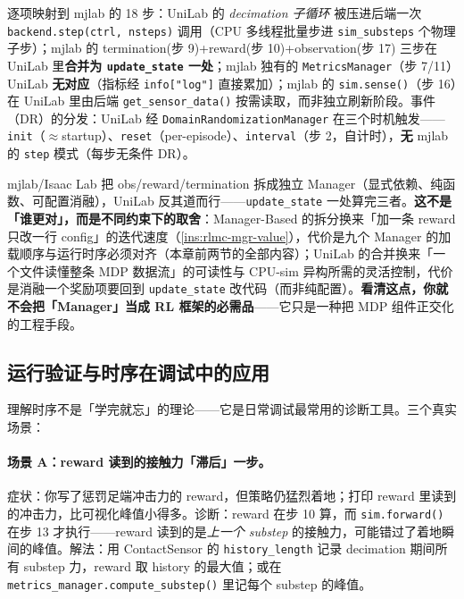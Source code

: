 逐项映射到 mjlab 的 18 步：UniLab 的 \emph{decimation 子循环} 被压进后端一次 \verb|backend.step(ctrl, nsteps)| 调用（CPU 多线程批量步进 \verb|sim_substeps| 个物理子步）；mjlab 的 termination(步 9)+reward(步 10)+observation(步 17) 三步在 UniLab 里\textbf{合并为 \texttt{update\_state} 一处}；mjlab 独有的 \verb|MetricsManager|（步 7/11）UniLab \textbf{无对应}（指标经 \verb|info["log"]| 直接累加）；mjlab 的 \verb|sim.sense()|（步 16）在 UniLab 里由后端 \verb|get_sensor_data()| 按需读取，而非独立刷新阶段。事件（DR）的分发：UniLab 经 \verb|DomainRandomizationManager| 在三个时机触发——\verb|init|（$\approx$startup）、\verb|reset|（per-episode）、\verb|interval|（步 2，自计时），\textbf{无} mjlab 的 \verb|step| 模式（每步无条件 DR）。

\begin{insight}\label{ins:rlmc-mgr-unilab}
mjlab/Isaac Lab 把 obs/reward/termination 拆成独立 Manager（显式依赖、纯函数、可配置消融），UniLab 反其道而行——\verb|update_state| 一处算完三者。\textbf{这不是「谁更对」，而是不同约束下的取舍}：Manager-Based 的拆分换来「加一条 reward 只改一行 config」的迭代速度（\cref{ins:rlmc-mgr-value}），代价是九个 Manager 的加载顺序与运行时序必须对齐（本章前两节的全部内容）；UniLab 的合并换来「一个文件读懂整条 MDP 数据流」的可读性与 CPU-sim 异构所需的灵活控制，代价是消融一个奖励项要回到 \texttt{update\_state} 改代码（而非纯配置）。\textbf{看清这点，你就不会把「Manager」当成 RL 框架的必需品}——它只是一种把 MDP 组件正交化的工程手段。
\end{insight}

\subsection{运行验证与时序在调试中的应用}

理解时序不是「学完就忘」的理论——它是日常调试最常用的诊断工具。三个真实场景：

\paragraph{场景 A：reward 读到的接触力「滞后」一步。}症状：你写了惩罚足端冲击力的 reward，但策略仍猛烈着地；打印 reward 里读到的冲击力，比可视化峰值小得多。诊断：reward 在步 10 算，而 \verb|sim.forward()| 在步 13 才执行——reward 读到的是\emph{上一个 substep} 的接触力，可能错过了着地瞬间的峰值。解法：用 ContactSensor 的 \verb|history_length| 记录 decimation 期间所有 substep 力，reward 取 history 的最大值；或在 \verb|metrics_manager.compute_substep()| 里记每个 substep 的峰值。


